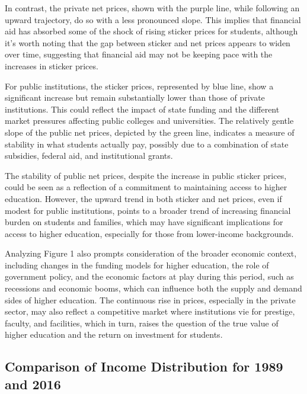 \documentclass[
  letterpaper,
  DIV=11,
  numbers=noendperiod]{scrartcl}
\begin{document}
In contrast, the private net prices, shown with the purple line, while
following an upward trajectory, do so with a less pronounced slope. This
implies that financial aid has absorbed some of the shock of rising
sticker prices for students, although it's worth noting that the gap
between sticker and net prices appears to widen over time, suggesting
that financial aid may not be keeping pace with the increases in sticker
prices.

For public institutions, the sticker prices, represented by blue line,
show a significant increase but remain substantially lower than those of
private institutions. This could reflect the impact of state funding and
the different market pressures affecting public colleges and
universities. The relatively gentle slope of the public net prices,
depicted by the green line, indicates a measure of stability in what
students actually pay, possibly due to a combination of state subsidies,
federal aid, and institutional grants.

The stability of public net prices, despite the increase in public
sticker prices, could be seen as a reflection of a commitment to
maintaining access to higher education. However, the upward trend in
both sticker and net prices, even if modest for public institutions,
points to a broader trend of increasing financial burden on students and
families, which may have significant implications for access to higher
education, especially for those from lower-income backgrounds.

Analyzing Figure 1 also prompts consideration of the broader economic
context, including changes in the funding models for higher education,
the role of government policy, and the economic factors at play during
this period, such as recessions and economic booms, which can influence
both the supply and demand sides of higher education. The continuous
rise in prices, especially in the private sector, may also reflect a
competitive market where institutions vie for prestige, faculty, and
facilities, which in turn, raises the question of the true value of
higher education and the return on investment for students.

\subsection{Comparison of Income Distribution for 1989 and
2016}\label{comparison-of-income-distribution-for-1989-and-2016}
\end{document}
